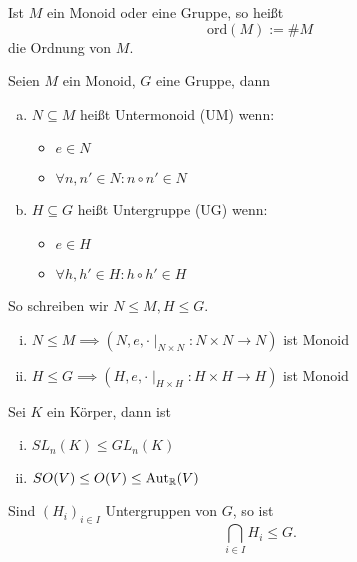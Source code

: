 \documentclass[a4paper]{report}
\begin{document}
\begin{defi}
  Ist $M$ ein Monoid oder eine Gruppe, so heißt $$\mathrm{ord}(M):=\#M$$
  die Ordnung von $M$.
\end{defi}

\begin{defi}
  Seien $M$ ein Monoid, $G$ eine Gruppe, dann
  \begin{enumerate}[(a)] %
    \item $N \subseteq M$ heißt Untermonoid (UM) wenn:
          \begin{itemize}
            \item $e \in N$
            \item $\forall n, n' \in N : n \circ n' \in N$
          \end{itemize}
    \item $H \subseteq G$ heißt Untergruppe (UG) wenn:
          \begin{itemize}
            \item $e \in H$
            \item $\forall h, h' \in H : h \circ h' \in H$
          \end{itemize}
  \end{enumerate}

So schreiben wir $N \leq M, H \leq G$.
\end{defi}

\begin{ubng}%
  \begin{enumerate}[(i)] %
    \item $N \leq M \implies (N, e, \cdot \mid_{N \times N}:N\times N \to N)$ ist Monoid
    \item $H \leq G \implies (H, e, \cdot \mid_{H \times H}:H\times H \to H)$ ist Monoid
  \end{enumerate}

\end{ubng}
\begin{bsp*}
  Sei $K$ ein Körper, dann ist
  \begin{enumerate}[(i)] %
    \item $SL_{n}(K) \leq GL_{n}(K)$
    \item $SO(V) \leq O(V) \le \mathrm{Aut}_{\Bbb R}(V)$
  \end{enumerate}
\end{bsp*}

\begin{prop}[Übung]
Sind $(H_{i})_{i \in I}$ Untergruppen von $G$, so ist
$$\bigcap_{i \in I} H_{i} \leq G.$$
\end{prop}
\end{document}
